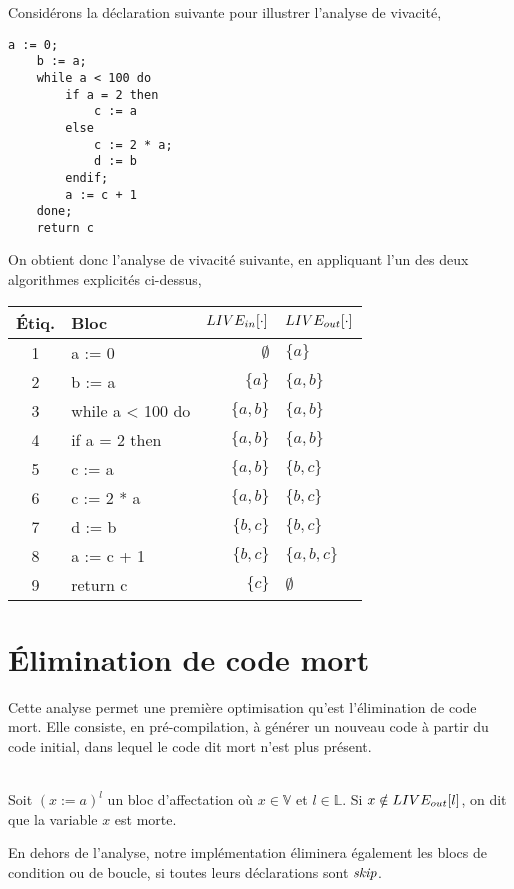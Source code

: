 \documentclass[a4paper, 10pt]{article}
\begin{document}
\begin{example}
Considérons la déclaration suivante pour illustrer l'analyse de vivacité,
\begin{lstlisting}[tabsize=2]
	a := 0;
	b := a;
	while a < 100 do
		if a = 2 then
			c := a
		else
			c := 2 * a;
			d := b
		endif;
		a := c + 1
	done;
	return c
\end{lstlisting}
On obtient donc l'analyse de vivacité suivante, en appliquant l'un des deux algorithmes explicités ci-dessus,
\\
\begin{center}
	\begin{tabular}{||c|l|r|l||}
	\hline
	Étiq. & Bloc & $LIVE_{in}[\cdot]$ & $LIVE_{out}[\cdot]$ \\
	\hline
	1 & a := 0 & $\emptyset$ & $\{a\}$\\
	2 & b := a & $\{a\}$ & $\{a, b\}$\\
	3 & while a < 100 do & $\{a, b\}$ & $\{a, b\}$\\
	4 & if a = 2 then & $\{a, b\}$ & $\{a, b\}$\\
	5 & c := a & $\{a, b\}$ & $\{b, c\}$\\
	6 & c := 2 * a & $\{a, b\}$ & $\{b, c\}$\\
	7 & d := b & $\{b, c\}$ & $\{b, c\}$\\
	8 & a := c + 1 & $\{b, c\}$ & $\{a, b, c\}$\\
	9 & return c & $\{c\}$ & $\emptyset$\\
	\hline
	\end{tabular}
\end{center}
\end{example}
\section{Élimination de code mort}
Cette analyse permet une première optimisation qu'est l'élimination de code mort. Elle consiste, en pré-compilation,
à générer un nouveau code à partir du code initial, dans lequel le code dit mort n'est plus présent.
\\
\\
\begin{definition}
	Soit $(x := a)^l$ un bloc d'affectation où $x \in \mathbb{V}$ et $l \in \mathbb{L}$. Si $x \notin LIVE_{out}[l]$, on dit que la variable $x$ est morte.
\end{definition}

En dehors de l'analyse, notre implémentation éliminera également les blocs de condition ou de boucle, si toutes leurs déclarations sont $\textit{skip}$.
\end{document}
